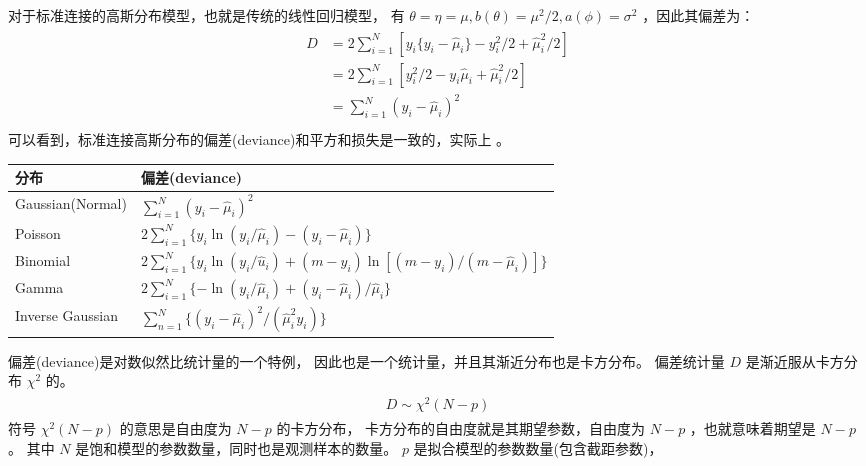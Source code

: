 \documentclass[letterpaper,10pt,english]{sphinxmanual}
\begin{document}

对于标准连接的高斯分布模型，也就是传统的线性回归模型，
有 \(\theta=\eta=\mu,b(\theta)=\mu^2/2,a(\phi)=\sigma^2\)
，因此其偏差为：
\begin{align}\label{equation:模型评估/content:模型评估/content:13}\!\begin{aligned}
D &= 2  \sum_{i=1}^N  [ y_i \{ y_i - \hat{\mu}_i \} - y_i^2/2 +\hat{\mu}_i^2/2 ]\\
&= 2 \sum_{i=1}^N  [ y_i^2/2  - y_i \hat{\mu}_i  +\hat{\mu}_i^2/2 ]\\
&= \sum_{i=1}^N  (y_i-\hat{\mu}_i)^2\\
\end{aligned}\end{align}
可以看到，标准连接高斯分布的偏差(deviance)和平方和损失是一致的，实际上
。


\begin{savenotes}\sphinxattablestart
\centering
{}
\sphinxthecaptionisattop
{}\label{\detokenize{_u6a21_u578b_u8bc4_u4f30/content:id12}}
\sphinxaftertopcaption
\begin{tabulary}{\linewidth}[t]{|T|T|}
\hline
\sphinxstyletheadfamily 
分布
&\sphinxstyletheadfamily 
偏差(deviance)
\\
\hline
Gaussian(Normal)
&
\(\sum_{i=1}^N (y_i-\hat{\mu}_i)^2\)
\\
\hline
Poisson
&
\(2 \sum_{i=1}^N \{ y_i\ln(y_i/\hat{\mu}_i) -(y_i-\hat{\mu}_i) \}\)
\\
\hline
Binomial
&
\(2\sum_{i=1}^N\{ y_i\ln(y_i/\hat{u}_i)+(m-y_i)\ln[(m-y_i)/(m-\hat{\mu}_i)] \}\)
\\
\hline
Gamma
&
\(2\sum_{i=1}^N\{-\ln(y_i/\hat{\mu}_i)+(y_i-\hat{\mu}_i)/\hat{\mu}_i\}\)
\\
\hline
Inverse Gaussian
&
\(\sum_{n=1}^N\{(y_i-\hat{\mu}_i)^2/(\hat{\mu}_i^2y_i)\}\)
\\
\hline
\end{tabulary}
\par
\sphinxattableend\end{savenotes}


偏差(deviance)是对数似然比统计量的一个特例，
因此也是一个统计量，并且其渐近分布也是卡方分布。
偏差统计量 \(D\) 是渐近服从卡方分布 \(\chi^2\) 的。
\begin{equation}\label{equation:模型评估/content:模型评估/content:14}
\begin{split}\begin{align}
D \sim \chi^2(N-p)
\end{align}\end{split}
\end{equation}
符号 \(\chi^2(N-p)\) 的意思是自由度为 \(N-p\) 的卡方分布，
卡方分布的自由度就是其期望参数，自由度为 \(N-p\) ，也就意味着期望是 \(N-p\)。
其中 \(N\) 是饱和模型的参数数量，同时也是观测样本的数量。
\(p\) 是拟合模型的参数数量(包含截距参数)，
\end{document}

